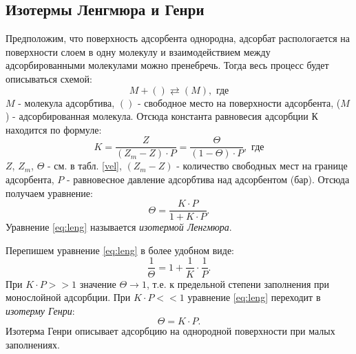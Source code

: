 \documentclass[a4paper,12pt]{article} %
\begin{document}
\subsection*{Изотермы Ленгмюра и Генри}
Предположим, что поверхность адсорбента однородна, адсорбат распологается на поверхности слоем в одну молекулу и взаимодействием между адсорбированными молекулами можно пренебречь. Тогда весь процесс будет описываться схемой:
\begin{equation*}
    M + () \rightleftarrows (M), \textrm{ где}
\end{equation*}
$M$ - молекула адсорбтива, 
\newline 
$()$ - свободное место на поверхности адсорбента, 
\newline 
($M$) - адсорбированная молекула. 
\newline
Отсюда константа равновесия адсорбции $К$ находится по формуле:
\begin{equation*}
    K = \dfrac{Z}{(Z_m - Z)\cdot P} = \dfrac{\Theta}{(1 - \Theta)\cdot P},  \textrm{ где}
\end{equation*}
\newline $Z$, $Z_m$, $\Theta$ - см. в табл. \ref{vel}, 
\newline $(Z_m - Z)$ - количество свободных мест на границе адсорбента, 
\newline $P$ - равновесное давление адсорбтива над адсорбентом (бар). 
\newline Отсюда получаем уравнение:
\begin{equation}
    \Theta = \dfrac{K \cdot P}{1 + K \cdot P}.
    \label{eq:leng}
\end{equation}
Уравнение \eqref{eq:leng} называется \textit{изотермой Ленгмюра}.
\par
Перепишем уравнение \eqref{eq:leng} в более удобном виде:
\begin{equation*}
    \dfrac{1}{\Theta} = 1 + \dfrac{1}{K} \cdot \dfrac{1}{P}.
\end{equation*}
При $K \cdot P >> 1$ значение $\Theta \rightarrow 1$, т.е. к предельной степени заполнения при монослойной адсорбции.
При $K \cdot P << 1$ уравнение \eqref{eq:leng} переходит в \textit{изотерму Генри}:
\begin{equation}
    \Theta = K \cdot P.
    \label{eq:henry}
\end{equation}
Изотерма Генри описывает адсорбцию на однородной поверхности при малых заполнениях.
\end{document}
